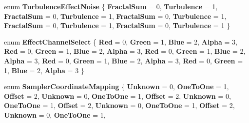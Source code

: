 \begin{DoxyCompactItemize}
\mbox{\label{namespace_microsoft_1_1_graphics_1_1_canvas_1_1_effects_a57ff6492fca7c9d4ed49c3588ec24c76}} 
enum {\bfseries Turbulence\+Effect\+Noise} \{ \newline
{\bfseries Fractal\+Sum} = 0, 
{\bfseries Turbulence} = 1, 
{\bfseries Fractal\+Sum} = 0, 
{\bfseries Turbulence} = 1, 
\newline
{\bfseries Fractal\+Sum} = 0, 
{\bfseries Turbulence} = 1, 
{\bfseries Fractal\+Sum} = 0, 
{\bfseries Turbulence} = 1, 
\newline
{\bfseries Fractal\+Sum} = 0, 
{\bfseries Turbulence} = 1
 \}
\item 
\mbox{\label{namespace_microsoft_1_1_graphics_1_1_canvas_1_1_effects_aa548de5fcafa34088d6dfff1bf77df8b}} 
enum {\bfseries Effect\+Channel\+Select} \{ \newline
{\bfseries Red} = 0, 
{\bfseries Green} = 1, 
{\bfseries Blue} = 2, 
{\bfseries Alpha} = 3, 
\newline
{\bfseries Red} = 0, 
{\bfseries Green} = 1, 
{\bfseries Blue} = 2, 
{\bfseries Alpha} = 3, 
\newline
{\bfseries Red} = 0, 
{\bfseries Green} = 1, 
{\bfseries Blue} = 2, 
{\bfseries Alpha} = 3, 
\newline
{\bfseries Red} = 0, 
{\bfseries Green} = 1, 
{\bfseries Blue} = 2, 
{\bfseries Alpha} = 3, 
\newline
{\bfseries Red} = 0, 
{\bfseries Green} = 1, 
{\bfseries Blue} = 2, 
{\bfseries Alpha} = 3
 \}
\item 
\mbox{\label{namespace_microsoft_1_1_graphics_1_1_canvas_1_1_effects_aee19f17bf119d8ef07f460eb2da92efe}} 
enum {\bfseries Sampler\+Coordinate\+Mapping} \{ \newline
{\bfseries Unknown} = 0, 
{\bfseries One\+To\+One} = 1, 
{\bfseries Offset} = 2, 
{\bfseries Unknown} = 0, 
\newline
{\bfseries One\+To\+One} = 1, 
{\bfseries Offset} = 2, 
{\bfseries Unknown} = 0, 
{\bfseries One\+To\+One} = 1, 
\newline
{\bfseries Offset} = 2, 
{\bfseries Unknown} = 0, 
{\bfseries One\+To\+One} = 1, 
{\bfseries Offset} = 2, 
\newline
{\bfseries Unknown} = 0, 
{\bfseries One\+To\+One} = 1, 

\end{DoxyCompactItemize}
